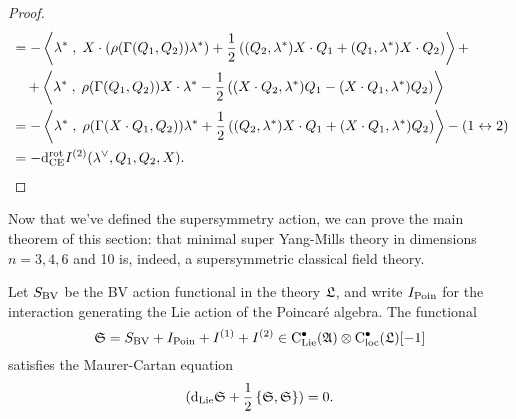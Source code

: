 \documentclass[10pt, oneside]{article}
\begin{document}
\begin{proof}
\begin{align*}
&= - \left\langle\lambda^* \;,\; X \cdot(\rho(\Gamma(Q_1,Q_2)) \lambda^*) + \frac 12 \left((Q_2, \lambda^*)X \cdot Q_1 + (Q_1, \lambda^*)X \cdot Q_2\right)\right\rangle + \\
&\quad + \left\langle\lambda^* \;,\; \rho(\Gamma(Q_1,Q_2)) X \cdot \lambda^* - \frac 12 \left((X \cdot Q_2, \lambda^*)Q_1 - (X \cdot Q_1,  \lambda^*)Q_2\right)\right\rangle \\
&= - \left\langle\lambda^* \;,\; \rho(\Gamma(X \cdot Q_1,Q_2)) \lambda^* + \frac 12 \left((Q_2, \lambda^*)X \cdot Q_1 + (X \cdot Q_1, \lambda^*)Q_2\right)\right\rangle - (1 \leftrightarrow 2)\\
&= -{\rm d}^{\mathrm{rot}}_{\mathrm{CE}} I^{(2)}(\lambda^\vee, Q_1, Q_2, X).
\end{align*}
\end{proof}

Now that we've defined the supersymmetry action, we can prove the main theorem of this section: that minimal super Yang-Mills theory in dimensions $n=3,4,6$ and 10 is, indeed, a supersymmetric classical field theory.

\begin{theorem} \label{SUSY_YM_theorem}
Let $S_{\mathrm{BV}}$ be the BV action functional in the theory $\mathfrak L$, and write $I_{\mathrm{Poin}}$ for the interaction generating the Lie action of the Poincar\'e algebra. The functional
\[\mathfrak S = S_{\mathrm{BV}} + I_{\mathrm{Poin}} + I^{(1)} + I^{(2)} \in {\rm C}_{\rm Lie}^\bullet(\mathfrak{A}) \otimes {\rm C}_{\rm loc}^\bullet(\mathfrak L) [-1]\]
satisfies the Maurer-Cartan equation
\begin{equation} 
\label{nd_MC}
({\rm d}_{\rm Lie} \mathfrak S + \frac{1}{2} \left\{\mathfrak S , \mathfrak S \right\}) = 0 .
\end{equation}
\end{theorem}
\end{document}
